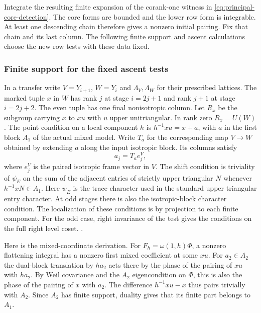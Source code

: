 Integrate the resulting finite expansion of the corank-one
witness in \eqref{eq:principal-core-detection}. The core
forms are bounded and the lower row form is integrable.
At least one descending chain therefore gives a nonzero
initial pairing. Fix that chain and its last column.
The following finite support and ascent calculations
choose the new row tests with these data fixed.

%
\subsubsection{Finite support for the fixed ascent tests}\label{sec:principal-ascent-finite}
In a transfer write \(V=Y_{i+1}\), \(W=Y_i\) and
\(\Lambda_V,\Lambda_W\) for their prescribed lattices.
The marked tuple \(x\) in \(W\) has rank \(j\) at
stage \(i=2j+1\) and rank \(j+1\) at stage \(i=2j+2\).
The even tuple has one final nonisotropic column.
Let \(R_x\) be the subgroup carrying \(x\) to \(x u\)
with \(u\) upper unitriangular. In rank zero \(R_x=U(W)\).
The point condition on a local component \(h\) is
\(h^{-1}x u=x+a\), with \(a\) in the first block
\(A_1\) of the actual mixed model. Write \(T_a\) for the
corresponding map \(V\to W\) obtained by extending \(a\)
along the input isotropic block. Its columns satisfy
\[
 a_j=T_a e_j^V ,
\]
where \(e_j^V\) is the paired isotropic frame vector in \(V\).
The shift condition is triviality of \(\psi_E\) on the
sum of the adjacent entries of strictly upper triangular
\(N\) whenever \(h^{-1}xN\in A_1\). Here \(\psi_E\) is
the trace character used in the standard upper triangular
entry character. At odd stages there is also
the isotropic-block character condition. The localization
of these conditions is by projection to each finite
component. For the odd case, right invariance of the
test gives the conditions on the full right level coset.
.

Here is the mixed-coordinate derivation. For
\(F_h=\omega(1,h)\Phi\), a nonzero flattening integral
has a nonzero first mixed coefficient at some \(x u\).
For \(a_2\in A_2\) the dual-block translation by \(h a_2\)
acts there by the phase of the pairing of \(x u\) with
\(h a_2\). By Weil covariance and the \(A_2\) eigencondition
on \(\Phi\), this is also the phase of the pairing of \(x\)
with \(a_2\). The difference \(h^{-1}x u-x\) thus pairs
trivially with \(A_2\). Since \(A_2\) has finite support,
duality gives that its finite part belongs to \(A_1\).

